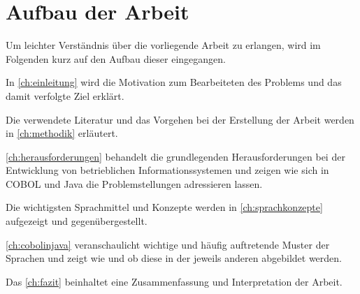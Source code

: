 \section{Aufbau der Arbeit}
Um leichter Verständnis über die vorliegende Arbeit zu erlangen, wird im Folgenden kurz auf den Aufbau dieser eingegangen.

In \autoref{ch:einleitung} wird die Motivation zum Bearbeiteten des Problems und das damit verfolgte Ziel erklärt. 

Die verwendete Literatur und das Vorgehen bei der Erstellung der Arbeit werden in \autoref{ch:methodik} erläutert.

\autoref{ch:herausforderungen} behandelt die grundlegenden Herausforderungen bei der Entwicklung von betrieblichen Informationssystemen und zeigen wie sich in COBOL und Java die Problemstellungen adressieren lassen.

Die wichtigsten Sprachmittel und Konzepte werden in \autoref{ch:sprachkonzepte} aufgezeigt und gegenübergestellt.

\autoref{ch:cobolinjava} veranschaulicht wichtige und häufig auftretende Muster der Sprachen und zeigt wie und ob diese in der jeweils anderen abgebildet werden.

Das \autoref{ch:fazit} beinhaltet eine Zusammenfassung und Interpretation der Arbeit.